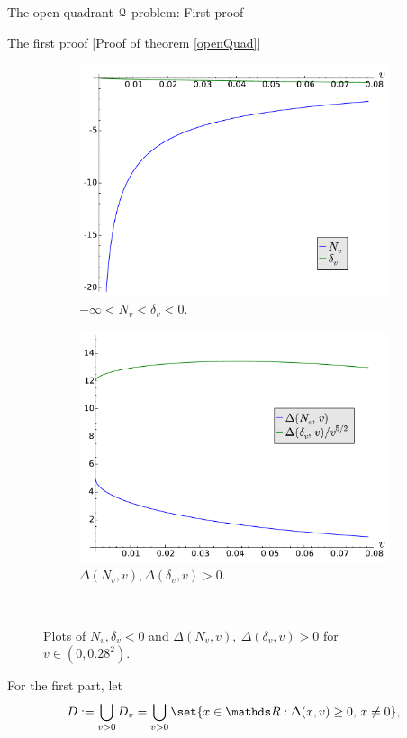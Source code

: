 \documentclass[11pt, a4paper, english, twoside, notitlepage, openright]{report}
\begin{document}
\begin{chapter}{The open quadrant $\mathcal{Q}$ problem: First proof}
\begin{section}{The first proof} [Proof of theorem \ref{openQuad}]
\begin{figure}[h]
\begin{subfigure}{.50\linewidth}
\includegraphics[width=1\textwidth]{plots/ch1_13_comp.pdf}
\caption{$-\infty<N_v<\delta_v<0$.\label{fig:comp}}
\end{subfigure}
\begin{subfigure}{.50\linewidth}\centering
\includegraphics[width=1\textwidth]{plots/ch1_14_positive.pdf}
\caption{$\Delta(N_{v}, v), \Delta(\delta_{v},v) > 0$.\label{fig:positive}}
\end{subfigure}\\[1ex]
\caption{Plots of $N_v,\delta_v<0$ and $\Delta(N_{v},v),\ \Delta(\delta_{v},v)>0$ for $v\in(0, 0.28^2)$.\label{fig:N_delta}}
\end{figure} For the first part, let 
$$
D:=\bigcup_{v>0}D_v=\bigcup_{v>0}\set{x\in\R:\Delta(x,v)\geq 0,\,x\neq 0},
$$
\end{section}
\end{chapter}
\end{document}
